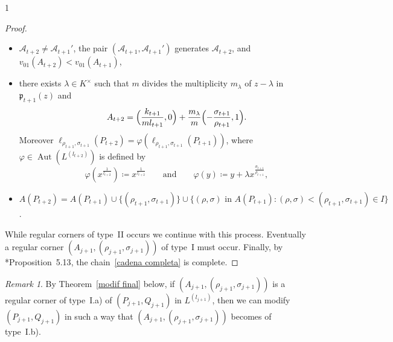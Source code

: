 \documentclass[reqno,a4paper,twoside]{amsart}
\theoremstyle{definition}
\theoremstyle{remark}
\newtheorem{remark}[theorem]{Remark}
\DeclareMathOperator{\Aut}{Aut}
\begin{document}
\begin{spacing}{1}
\begin{proof}
\begin{itemize}[itemsep=0.5675ex,topsep=0.5675ex]
\item[-] $\mathcal{A}_{t+2}\ne \mathcal{A}_{t+1}'$, the pair $(\mathcal{A}_{t+1},\mathcal{A}_{t+1}')$ generates $\mathcal{A}_{t+2}$, and $v_{01}(A_{t+2})<v_{01}(A_{t+1})$,

\item[-] there exists $\lambda\in K^{\times}$ such that $m$ divides the multiplicity $m_{\lambda}$ of $z-\lambda$ in $\mathfrak{p}_{t+1}(z)$ and
$$
\qquad\quad A_{t+2} = \Bigl(\frac{k_{t+1}}{m l_{t+1}},0\Bigr) + \frac{m_{\lambda}}{m} \Bigl(-\frac{\sigma_{t+1}}{\rho_{t+1}}, 1\Bigr).
$$
Moreover $\ell_{\rho_{t+1},\sigma_{t+1}}(P_{t+2}) = \varphi(\ell_{\rho_{t+1},\sigma_{t+1}}(P_{t+1}))$, where $\varphi\in \Aut(L^{(l_{t+2})})$ is defined by
$$
\qquad\quad \varphi(x^{\frac{1}{l_{t+2}}})\coloneqq x^{\frac{1}{l_{t+2}}}\qquad\text{and}\qquad \varphi(y)\coloneqq y+\lambda x^{\frac{\sigma_{t+1}}{\rho_{t+1}}},
$$

\item[-] $A(P_{t+2}) = A(P_{t+1})\cup \{(\rho_{t+1},\sigma_{t+1})\}\cup \{(\rho,\sigma)\text{ in } A(P_{t+1}): (\rho,\sigma)<(\rho_{t+1},\sigma_{t+1})\in I\}$.

\end{itemize}
While regular corners of type~II occurs we continue with this process. Eventually a regular corner $(A_{j+1},(\rho_{j+1},\sigma_{j+1}))$ of type~I must occur. Finally, by \cite{GGV1}*{Proposition~5.13}, the chain~\eqref{cadena completa} is complete.
\end{proof}

\begin{remark}\label{rem 2.21p} By Theorem~\ref{modif final} below, if $(A_{j+1},(\rho_{j+1},\sigma_{j+1}))$ is a regular corner of type~I.a) of $(P_{j+1},Q_{j+1})$ in $L^{(l_{j+1})}$, then we can modify $(P_{j+1},Q_{j+1})$ in such a way that $(A_{j+1},(\rho_{j+1},\sigma_{j+1}))$ becomes of type~I.b).
\end{remark}


\end{spacing}
\end{document}
